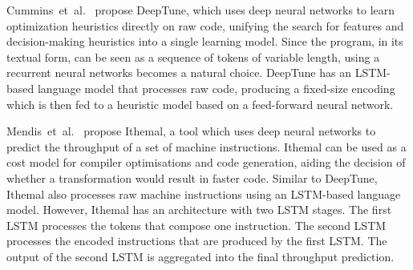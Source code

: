 Cummins~et~al.~\cite{cummins17} propose DeepTune, which uses deep neural networks to learn optimization heuristics directly on raw code, unifying the search for features and decision-making heuristics into a single learning model.
Since the program, in its textual form, can be seen as a sequence of tokens of variable length, using a recurrent neural networks becomes a natural choice.
DeepTune has an LSTM-based language model that processes raw code, producing a fixed-size encoding which is then fed to a heuristic model based on a feed-forward neural network.

Mendis~et~al.~\cite{mendis19} propose Ithemal, a tool which uses deep neural networks to predict the throughput of a set of machine instructions.
Ithemal can be used as a cost model for compiler optimisations and code generation, aiding the decision of whether a transformation would result in faster code.
Similar to DeepTune, Ithemal also processes raw machine instructions using an LSTM-based language model.
However, Ithemal has an architecture with two LSTM stages.
The first LSTM processes the tokens that compose one instruction.
The second LSTM processes the encoded instructions that are produced by the first LSTM.
The output of the second LSTM is aggregated into the final throughput prediction.
